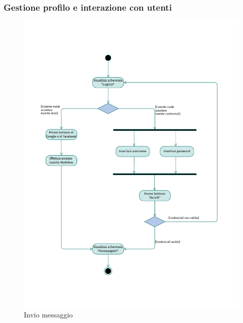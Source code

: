 \documentclass{natourDoc}
\begin{document}
\subsubsection{Gestione profilo e interazione con utenti}
\begin{figure}[!htbp]
	\centering
	\includegraphics[width=\textwidth, page=16]{./diagrams/activity.pdf}
	\caption{Invio messaggio}
\end{figure}
\FloatBarrier
\end{document}
